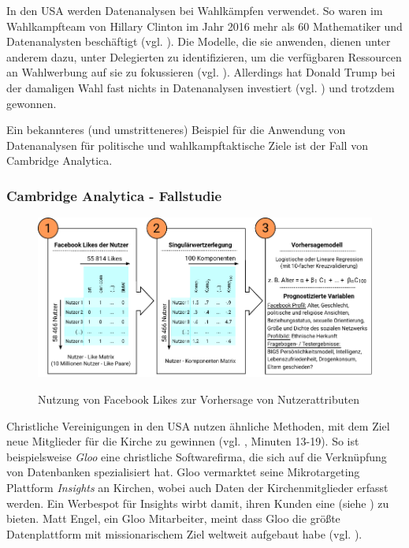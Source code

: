In den USA werden Datenanalysen bei Wahlkämpfen verwendet. So waren im Wahlkampfteam von
Hillary Clinton im Jahr 2016 mehr als 60 Mathematiker und Datenanalysten beschäftigt (vgl. \cite{Goldmacher}). 
Die Modelle, die sie anwenden, dienen unter anderem dazu, \grqq{} unter Delegierten zu identifizieren,
um die verfügbaren Ressourcen an Wahlwerbung auf sie zu fokussieren (vgl. \cite{Goldmacher}). Allerdings hat Donald Trump bei der damaligen Wahl
fast nichts in Datenanalysen investiert (vgl. \cite{Goldmacher}) und trotzdem gewonnen.

Ein bekannteres (und umstritteneres) Beispiel für die Anwendung von Datenanalysen
für politische und wahlkampftaktische Ziele ist der Fall von Cambridge Analytica.

\subsubsection{Cambridge Analytica - Fallstudie}

\begin{figure}%
\centering
\caption{Nutzung von Facebook Likes zur Vorhersage von Nutzerattributen}
\includegraphics[scale=1.0]{Grafiken/Facebook_Likes_Ink.pdf} 
\label{pic:Like_Matrix}
\end{figure}


Christliche Vereinigungen in den USA nutzen ähnliche Methoden, mit dem Ziel neue Mitglieder für die Kirche
zu gewinnen (vgl. \cite{Viken}, Minuten 13-19). So ist beispielsweise \emph{Gloo} eine christliche Softwarefirma,
die sich auf die Verknüpfung von Datenbanken spezialisiert hat. Gloo vermarktet seine Mikrotargeting Plattform
\emph{Insights} an Kirchen, wobei auch Daten der Kirchenmitglieder erfasst werden. Ein Werbespot für Insights
wirbt damit, ihren Kunden eine \grqq{} (siehe \cite{Viken}) zu bieten. Matt Engel, ein Gloo
Mitarbeiter, meint dass Gloo die größte Datenplattform mit missionarischem Ziel weltweit aufgebaut habe (vgl. \cite{Viken}).

